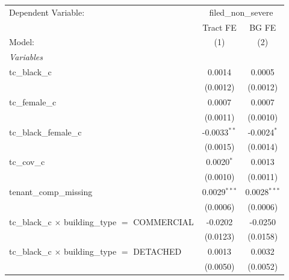 \begin{tabular}{lcc}
   \tabularnewline \midrule \midrule
   Dependent Variable: & \multicolumn{2}{c}{filed\_non\_severe}\\
                                                                       & Tract FE              & BG FE \\   
   Model:                                                              & (1)                   & (2)\\  
   \midrule
   \emph{Variables}\\
   tc\_black\_c                                                        & 0.0014                & 0.0005\\   
                                                                       & (0.0012)              & (0.0012)\\   
   tc\_female\_c                                                       & 0.0007                & 0.0007\\   
                                                                       & (0.0011)              & (0.0010)\\   
   tc\_black\_female\_c                                                & -0.0033$^{**}$        & -0.0024$^{*}$\\   
                                                                       & (0.0015)              & (0.0014)\\   
   tc\_cov\_c                                                          & 0.0020$^{*}$          & 0.0013\\   
                                                                       & (0.0010)              & (0.0011)\\   
   tenant\_comp\_missing                                               & 0.0029$^{***}$        & 0.0028$^{***}$\\   
                                                                       & (0.0006)              & (0.0006)\\   
   tc\_black\_c $\times$ building\_type $=$ COMMERCIAL                 & -0.0202               & -0.0250\\   
                                                                       & (0.0123)              & (0.0158)\\   
   tc\_black\_c $\times$ building\_type $=$ DETACHED                   & 0.0013                & 0.0032\\   
                                                                       & (0.0050)              & (0.0052)\\   

\end{tabular}
